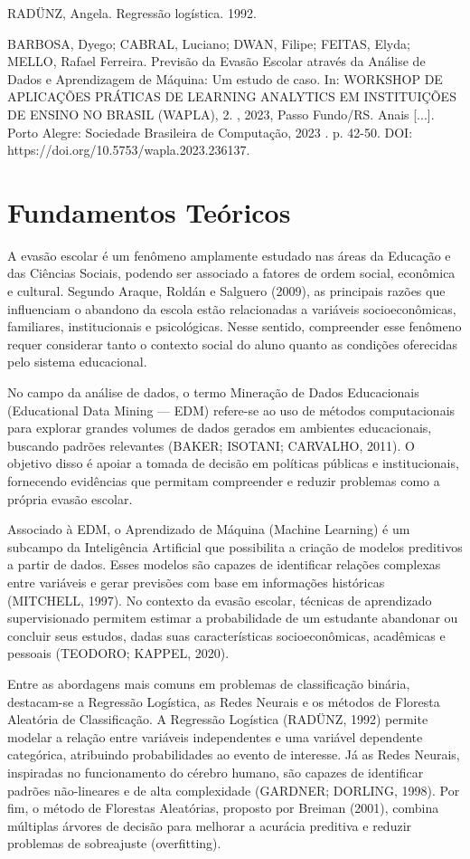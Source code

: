 \documentclass[english, spanish, brazilian]{RBIEarticle} %
\begin{document}
RADÜNZ, Angela. Regressão logística. 1992.

BARBOSA, Dyego; CABRAL, Luciano; DWAN, Filipe; FEITAS, Elyda; MELLO, Rafael Ferreira. Previsão da Evasão Escolar através da Análise de Dados e Aprendizagem de Máquina: Um estudo de caso. In: WORKSHOP DE APLICAÇÕES PRÁTICAS DE LEARNING ANALYTICS EM INSTITUIÇÕES DE ENSINO NO BRASIL (WAPLA), 2. , 2023, Passo Fundo/RS. Anais [...]. Porto Alegre: Sociedade Brasileira de Computação, 2023 . p. 42-50. DOI: https://doi.org/10.5753/wapla.2023.236137.

\section{Fundamentos Teóricos}

A evasão escolar é um fenômeno amplamente estudado nas áreas da Educação e das Ciências Sociais, podendo ser associado a fatores de ordem social, econômica e cultural. Segundo Araque, Roldán e Salguero (2009), as principais razões que influenciam o abandono da escola estão relacionadas a variáveis socioeconômicas, familiares, institucionais e psicológicas. Nesse sentido, compreender esse fenômeno requer considerar tanto o contexto social do aluno quanto as condições oferecidas pelo sistema educacional. 

No campo da análise de dados, o termo Mineração de Dados Educacionais (Educational Data Mining — EDM) refere-se ao uso de métodos computacionais para explorar grandes volumes de dados gerados em ambientes educacionais, buscando padrões relevantes (BAKER; ISOTANI; CARVALHO, 2011). O objetivo disso é apoiar a tomada de decisão em políticas públicas e institucionais, fornecendo evidências que permitam compreender e reduzir problemas como a própria evasão escolar.

Associado à EDM, o Aprendizado de Máquina (Machine Learning) é um subcampo da Inteligência Artificial que possibilita a criação de modelos preditivos a partir de dados. Esses modelos são capazes de identificar relações complexas entre variáveis e gerar previsões com base em informações históricas (MITCHELL, 1997). No contexto da evasão escolar, técnicas de aprendizado supervisionado permitem estimar a probabilidade de um estudante abandonar ou concluir seus estudos, dadas suas características socioeconômicas, acadêmicas e pessoais (TEODORO; KAPPEL, 2020).

Entre as abordagens mais comuns em problemas de classificação binária, destacam-se a Regressão Logística, as Redes Neurais e os métodos de Floresta Aleatória de Classificação. A Regressão Logística (RADÜNZ, 1992) permite modelar a relação entre variáveis independentes e uma variável dependente categórica, atribuindo probabilidades ao evento de interesse. Já as Redes Neurais, inspiradas no funcionamento do cérebro humano, são capazes de identificar padrões não-lineares e de alta complexidade (GARDNER; DORLING, 1998). Por fim, o método de Florestas Aleatórias, proposto por Breiman (2001), combina múltiplas árvores de decisão para melhorar a acurácia preditiva e reduzir problemas de sobreajuste (overfitting).
\end{document}
